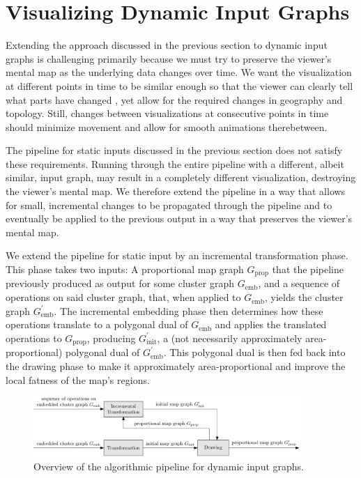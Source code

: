\chapter{Visualizing Dynamic Input Graphs}
\label{chap:visualizing-dynamic-input-graphs}

Extending the approach discussed in the previous section to dynamic input graphs is challenging primarily because we must try to preserve the viewer's mental map as the underlying data changes over time.
We want the visualization at different points in time to be similar enough so that the viewer can clearly tell what parts have changed \cite{mashima2011visualizing}, yet allow for the required changes in geography and topology.
Still, changes between visualizations at consecutive points in time should minimize movement and allow for smooth animations therebetween.

The pipeline for static inputs discussed in the previous section does not satisfy these requirements.
Running through the entire pipeline with a different, albeit similar, input graph, may result in a completely different visualization, destroying the viewer's mental map.
We therefore extend the pipeline in a way that allows for small, incremental changes to be propagated through the pipeline and to eventually be applied to the previous output in a way that preserves the viewer's mental map.

We extend the pipeline for static input by an incremental transformation phase.
This phase takes two inputs: A proportional map graph $G_\text{prop}$ that the pipeline previously produced as output for some cluster graph $G_\text{emb}$, and a sequence of operations on said cluster graph, that, when applied to $G_\text{emb}$, yields the cluster graph $G_\text{emb}^\prime$.
The incremental embedding phase then determines how these operations translate to a polygonal dual of $G_\text{emb}$ and applies the translated operations to $G_\text{prop}$, producing $G_\text{init}^\prime$, a (not necessarily approximately area-proportional) polygonal dual of $G_\text{emb}^\prime$.
This polygonal dual is then fed back into the drawing phase to make it approximately area-proportional and improve the local fatness of the map's regions.

\begin{figure}[H]
	\centering\includegraphics[width=0.9\textwidth]{Resources/Pipeline-Thesis-Dynamic.pdf}
	\caption{Overview of the algorithmic pipeline for dynamic input graphs.}
	\label{fig:dynamic-pipeline-thesis}
\end{figure}

